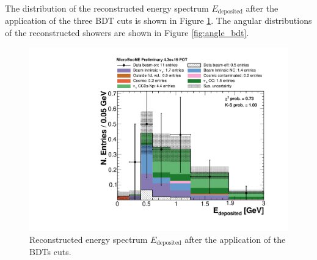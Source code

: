 The distribution of the reconstructed energy spectrum $E_{\mathrm{deposited}}$ after the application of the three BDT cuts is shown in Figure \ref{fig:reco_bdt}. The angular distributions of the reconstructed showers are shown in Figure \ref{fig:angle_bdt}. 

\begin{figure}[htbp]
\centering
  \includegraphics[width=0.75\linewidth]{figures/h_reco_energy_bdt.pdf}
  \caption{Reconstructed energy spectrum $E_{\mathrm{deposited}}$ after the application of the BDTs cuts.}\label{fig:reco_bdt}
\end{figure}

